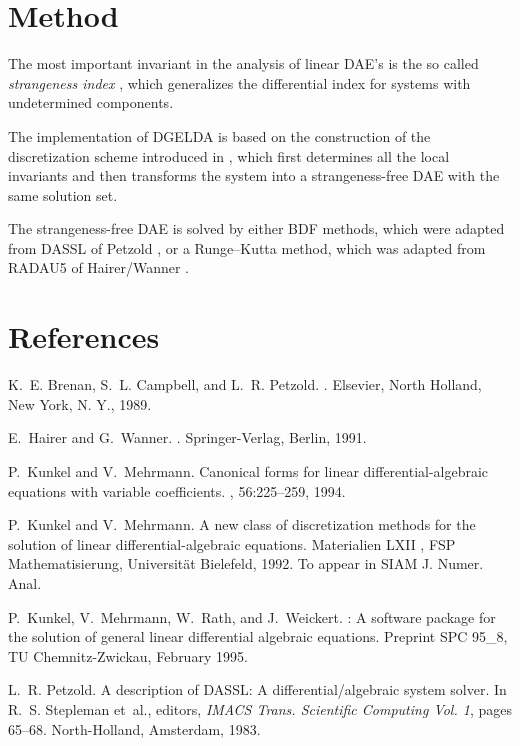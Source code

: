 \section{Method}

The most important invariant in the analysis of linear DAE's is the so
called {\it strangeness index} \cite{KunM92}, which generalizes the
differential index \cite{BreCP89} for systems with undetermined
components. 

The implementation of DGELDA \cite{KunMRW95} is based on the
construction of the discretization scheme introduced in
\cite{KunM94a}, which first determines all the local invariants and
then transforms the system into a strangeness-free DAE with the same
solution set.  

The strangeness-free DAE is solved by either BDF methods, which were
adapted from DASSL of Petzold \cite{Pet83}, or a Runge--Kutta method,
which was adapted from RADAU5 of Hairer/Wanner \cite{HaiW91}. 

\section{References}

%
%
\begin{thebibliography}{1}

K.~E. Brenan, S.~L. Campbell, and L.~R. Petzold.
.
\newblock Elsevier, North Holland, New York, N. Y., 1989.

E.~Hairer and G.~Wanner.
.
\newblock Springer-Verlag, Berlin, 1991.

P.~Kunkel and V.~Mehrmann.
\newblock Canonical forms for linear differential-algebraic equations with
  variable coefficients.
, 56:225--259, 1994.

P.~Kunkel and V.~Mehrmann.
\newblock A new class of discretization methods for the solution of linear
  differential-algebraic equations.
\newblock Materialien LXII , FSP Mathematisierung, Universit{\"a}t Bielefeld,
  1992.
\newblock To appear in SIAM J. Numer. Anal.

P.~Kunkel, V.~Mehrmann, W.~Rath, and J.~Weickert.
: A software package for the solution of general linear
  differential algebraic equations.
\newblock Preprint SPC 95\_8, TU Chemnitz-Zwickau, February 1995.

L.~R. Petzold.
\newblock A description of {DASSL}: A differential/algebraic system solver.
\newblock In R.~S. Stepleman et~al., editors, {\em IMACS Trans. Scientific
  Computing Vol. 1}, pages 65--68. North-Holland, Amsterdam, 1983.

\end{thebibliography}


